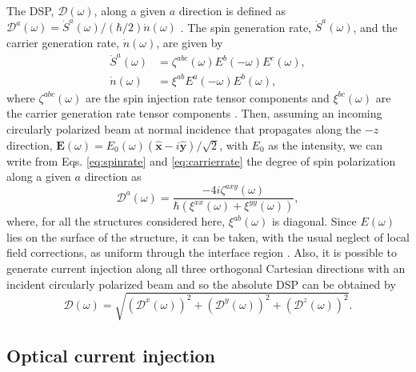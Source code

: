 \documentclass[pss]{wiley2sp} %
\begin{document}
The DSP, $\boldsymbol{\mathcal{D}}(\omega)$, along a given $a$ direction is defined as $\mathcal{D}^{a}(\omega)=\dot{S}^{a}(\omega)/(\hbar/2)\dot{n}(\omega)$ \cite{mendozaPRB12}. The spin
generation rate, $\dot{S}^{a}(\omega)$, and the carrier generation rate,
$\dot{n}(\omega)$, are given by
\begin{align}
\dot{S}^{a}(\omega)&= 
\zeta^{abc}(\omega)E^{b}(-\omega)E^{c}(\omega), \label{eq:spinrate} \\
\dot{n}(\omega)&= 
\xi^{ab}E^{a}(-\omega)E^{b}(\omega), \label{eq:carrierrate}
\end{align}
where $\zeta^{abc}(\omega)$ are the spin injection rate tensor components and $\xi^{bc}(\omega)$ are the carrier generation rate tensor components \cite{arzatePRB14}. Then, assuming an incoming circularly polarized beam at normal incidence that propagates along the $-z$ direction, $\mathbf{E}(\omega) = E_{0}(\omega)(\mathbf{\hat{x}} - i\mathbf{\hat{y}})/\sqrt{2}$, with $E_{0}$ as the intensity, we can write from  Eqs. \eqref{eq:spinrate} and \eqref{eq:carrierrate} the degree of spin polarization along a given $a$ direction \cite{arzatePRB14} as
\begin{equation}\label{eq:D^i}
\mathcal{D}^{a}(\omega) =  
\frac{-4i\zeta^{axy}(\omega)}
    {\hbar\left(\xi^{xx}(\omega) + \xi^{yy}(\omega)\right)},
\end{equation}
where, for all the structures considered here, $\xi^{ab}(\omega)$ is diagonal. Since $E(\omega)$ lies on the surface of the structure, it can be taken, with the usual neglect of local field corrections, as uniform through the interface region \cite{mendozaPRB12}. Also, it is possible to generate current injection along all three orthogonal Cartesian directions with an incident circularly polarized beam and so the absolute DSP can be obtained by \cite{arzatePRB14}
\begin{equation}\label{eq:dsptotal}
\mathcal{D}(\omega) =
\sqrt{(\mathcal{D}^{x}(\omega))^{2} + 
      (\mathcal{D}^{y}(\omega))^{2} +
      (\mathcal{D}^{z}(\omega))^{2}
      }.
\end{equation}


\subsection{Optical current injection}\label{sec:theory-OCI}
\end{document}
